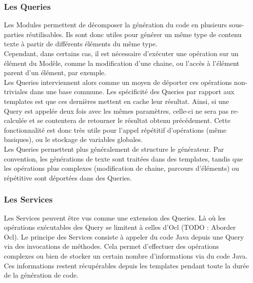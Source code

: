 
\subsubsection{Les Queries}

Les Modules permettent de décomposer la génération du code en plusieurs sous-parties réutilisables. Ils sont donc utiles pour générer un même type de contenu texte à partir de différents éléments du même type.\\
Cependant, dans certains cas, il est nécessaire d'exécuter une opération sur un élément du Modèle, comme la modification d'une chaine, ou l'accès à l'élément parent d'un élément, par exemple.\\
Les Queries interviennent alors comme un moyen de déporter ces opérations non-triviales dans une base commune. Les spécificité des Queries par rapport aux templates est que ces dernières mettent en cache leur résultat. Ainsi, si une Query est appelée deux fois avec les mêmes paramètres, celle-ci ne sera pas re-calculée et se contentera de retourner le résultat obtenu précédement. Cette fonctionnalité est donc très utile pour l'appel répétitif d'opérations (même basiques), ou le stockage de variables globales.\\
Les Queries permettent plus généralement de structure le générateur. Par convention, les générations de texte sont traitées dans des templates, tandis que les opérations plus complexes (modification de chaine, parcours d'éléments) ou répétitive sont déportées dans des Queries.

\subsubsection{Les Services}

Les Services peuvent être vus comme une extension des Queries. Là où les opérations exécutables des Query se limitent à celles d'Ocl (TODO : Aborder Ocl). Le principe des Services consiste à appeler du code Java depuis une Query via des invocations de méthodes. Cela permet d'effectuer des opérations complexes ou bien de stocker un certain nombre d'informations via du code Java. Ces informations restent récupérables depuis les templates pendant toute la durée de la génération de code.


%



 



